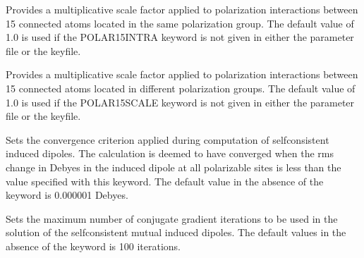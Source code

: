 \documentclass[letterpaper,11pt,english]{sphinxmanual}
\begin{document}
\ignorespaces {}\label{\detokenize{text/keywords:key-polar-15-intra}}\begin{description}
\sphinxAtStartPar
Provides a multiplicative scale factor applied to polarization interactions between 1\sphinxhyphen{}5 connected atoms located in the same polarization group. The default value of 1.0 is used if the POLAR\sphinxhyphen{}15\sphinxhyphen{}INTRA keyword is not given in either the parameter file or the keyfile.

\end{description}

\ignorespaces {}\label{\detokenize{text/keywords:key-polar-15-scale}}\begin{description}
\sphinxAtStartPar
Provides a multiplicative scale factor applied to polarization interactions between 1\sphinxhyphen{}5 connected atoms located in different polarization groups. The default value of 1.0 is used if the POLAR\sphinxhyphen{}15\sphinxhyphen{}SCALE keyword is not given in either the parameter file or the keyfile.

\end{description}

\ignorespaces {}\label{\detokenize{text/keywords:key-polar-eps}}\begin{description}
\sphinxAtStartPar
Sets the convergence criterion applied during computation of self\sphinxhyphen{}consistent induced dipoles. The calculation is deemed to have converged when the rms change in Debyes in the induced dipole at all polarizable sites is less than the value specified with this keyword. The default value in the absence of the keyword is 0.000001 Debyes.

\end{description}

\ignorespaces {}\label{\detokenize{text/keywords:key-polar-iter}}\begin{description}
\sphinxAtStartPar
Sets the maximum number of conjugate gradient iterations to be used in the solution of the self\sphinxhyphen{}consistent mutual induced dipoles. The default values in the absence of the keyword is 100 iterations.

\end{description}
\end{document}
